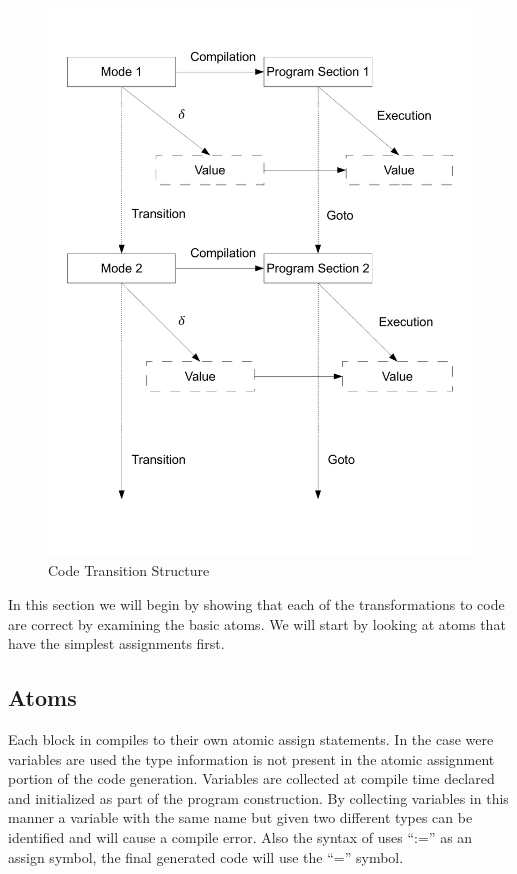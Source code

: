 \begin{figure}[htb]
    \centering
    \includegraphics[trim= 10mm 30mm 10mm 10mm, clip, width=\imgmedium]{./images/correctness_graph2.pdf}
    \caption{Code Transition Structure}
    \label{fig:correctness_graph2}
\end{figure}

In this section we will begin by showing that each of the transformations to code are 
correct by examining the basic atoms. We will start by looking at atoms that have the 
simplest assignments first.

\clearpage
\subsection{Atoms}

Each block in \plccharts compiles to their own atomic assign statements.
In the case were variables are used the type information is not present in 
the atomic assignment portion of the code generation. 
Variables are collected at compile time declared and initialized as part of 
the program construction. By collecting variables in this manner a variable 
with the same name but given two different types can be identified and will 
cause a compile error. Also the syntax of \plccharts uses ``:='' as an 
assign symbol, the final generated code will use the ``='' symbol.


